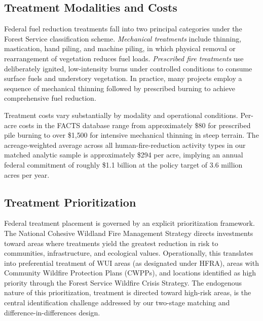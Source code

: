 \documentclass[12pt, letterpaper]{article}
\begin{document}
\subsection{Treatment Modalities and Costs}

Federal fuel reduction treatments fall into two principal categories under the Forest Service classification scheme. \textit{Mechanical treatments} include thinning, mastication, hand piling, and machine piling, in which physical removal or rearrangement of vegetation reduces fuel loads. \textit{Prescribed fire treatments} use deliberately ignited, low-intensity burns under controlled conditions to consume surface fuels and understory vegetation. In practice, many projects employ a sequence of mechanical thinning followed by prescribed burning to achieve comprehensive fuel reduction.

Treatment costs vary substantially by modality and operational conditions. Per-acre costs in the FACTS database range from approximately \$80 for prescribed pile burning to over \$1{,}500 for intensive mechanical thinning in steep terrain. The acreage-weighted average across all human-fire-reduction activity types in our matched analytic sample is approximately \$294 per acre, implying an annual federal commitment of roughly \$1.1 billion at the policy target of 3.6 million acres per year.

\subsection{Treatment Prioritization}

Federal treatment placement is governed by an explicit prioritization framework. The National Cohesive Wildland Fire Management Strategy directs investments toward areas where treatments yield the greatest reduction in risk to communities, infrastructure, and ecological values. Operationally, this translates into preferential treatment of WUI areas (as designated under HFRA), areas with Community Wildfire Protection Plans (CWPPs), and locations identified as high priority through the Forest Service Wildfire Crisis Strategy. The endogenous nature of this prioritization, treatment is directed toward high-risk areas, is the central identification challenge addressed by our two-stage matching and difference-in-differences design.


\end{document}
